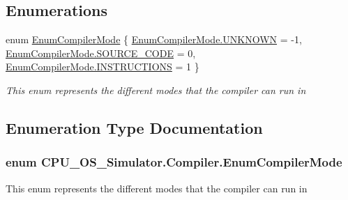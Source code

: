 \subsection*{Enumerations}
\begin{DoxyCompactItemize}
\item 
enum \hyperlink{namespace_c_p_u___o_s___simulator_1_1_compiler_ada8d93b571fa15a0f2eac8c9647a89fe}{Enum\+Compiler\+Mode} \{ \hyperlink{namespace_c_p_u___o_s___simulator_1_1_compiler_ada8d93b571fa15a0f2eac8c9647a89fea696b031073e74bf2cb98e5ef201d4aa3}{Enum\+Compiler\+Mode.\+U\+N\+K\+N\+O\+W\+N} = -\/1, 
\hyperlink{namespace_c_p_u___o_s___simulator_1_1_compiler_ada8d93b571fa15a0f2eac8c9647a89feac31dd0847839ccae1447bac2f474a003}{Enum\+Compiler\+Mode.\+S\+O\+U\+R\+C\+E\+\_\+\+C\+O\+D\+E} = 0, 
\hyperlink{namespace_c_p_u___o_s___simulator_1_1_compiler_ada8d93b571fa15a0f2eac8c9647a89fea94a4525d62a2828c7aa1f8dc47a0ffb5}{Enum\+Compiler\+Mode.\+I\+N\+S\+T\+R\+U\+C\+T\+I\+O\+N\+S} = 1
 \}\begin{DoxyCompactList}\small\item\em This enum represents the different modes that the compiler can run in \end{DoxyCompactList}
\end{DoxyCompactItemize}


\subsection{Enumeration Type Documentation}
\hypertarget{namespace_c_p_u___o_s___simulator_1_1_compiler_ada8d93b571fa15a0f2eac8c9647a89fe}{}
\subsubsection[{Enum\+Compiler\+Mode}]{\setlength{\rightskip}{0pt plus 5cm}enum {\bf C\+P\+U\+\_\+\+O\+S\+\_\+\+Simulator.\+Compiler.\+Enum\+Compiler\+Mode}\hspace{0.3cm}{\ttfamily [strong]}}\label{namespace_c_p_u___o_s___simulator_1_1_compiler_ada8d93b571fa15a0f2eac8c9647a89fe}


This enum represents the different modes that the compiler can run in 

